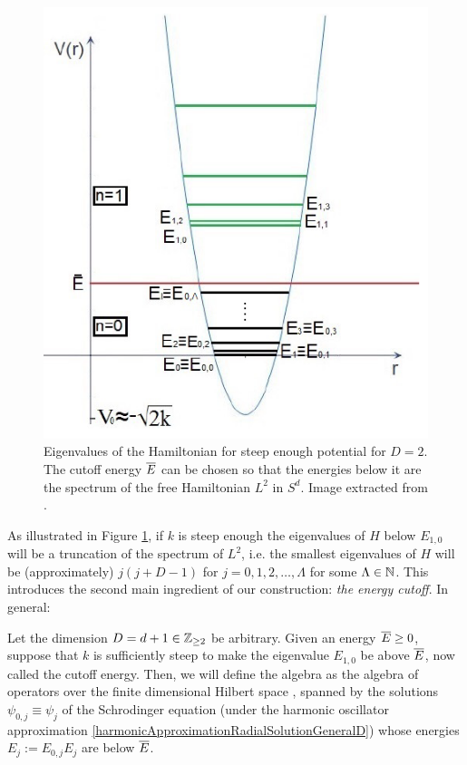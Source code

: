 \begin{figure}[h][h]
    \centering
    \includegraphics[width = 2\textwidth/3/2]{images/FioreEigenvalues.PNG}
    \caption{Eigenvalues of the Hamiltonian for steep enough potential for $D = 2$. The cutoff energy $\overline{E}$ can be chosen so that the energies below it are the spectrum of the free Hamiltonian $L^2$ in $S^d$. Image extracted from \cite{Fiore2018}.}
    \label{fig:D2EigenvaluesEigenEnergiesHarmonicCutoff}
\end{figure}

As illustrated in Figure \ref{fig:D2EigenvaluesEigenEnergiesHarmonicCutoff}, if $k$ is steep enough%
the eigenvalues of $H$ below $E_{1,0}$ will be a truncation of the spectrum of $L^2$, i.e. the smallest eigenvalues of $H$ will be (approximately) $j(j+D-1)$ for $j = 0, 1, 2, \dots, \Lambda$ for some $\Lambda \in \mathbb{N}$. This introduces the second main ingredient of our construction: \emph{the energy cutoff}. In general:
\begin{definition}\label{definitionAcalHcalGeneralD}
Let the dimension $D = d + 1 \in \mathbb{Z}_{\geq 2}$ be arbitrary. Given an energy $\overline{E} \geq 0$, suppose that $k$ is sufficiently steep to make the eigenvalue $E_{1, 0}$ be above $\overline{E}$, now called the cutoff energy. %
Then, we will define the algebra  as the algebra of operators over the finite dimensional Hilbert space , spanned by the solutions $\psi_{0, j} \equiv \psi_j$ of the Schrodinger equation (under the harmonic oscillator approximation \eqref{harmonicApproximationRadialSolutionGeneralD}) whose energies $E_j := E_{0, j}E_j$ are below $\overline{E}$.
\end{definition}

